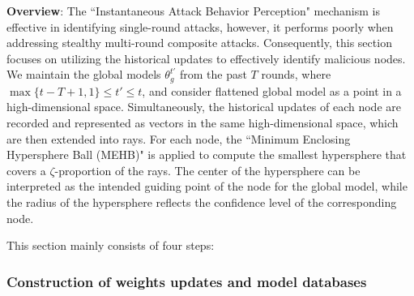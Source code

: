 \documentclass[lettersize,journal]{IEEEtran}
\begin{document}
\textbf{Overview}: The ``Instantaneous Attack Behavior Perception" mechanism is effective in identifying single-round attacks, however, it performs poorly when addressing stealthy multi-round composite attacks. Consequently, this section focuses on utilizing the historical updates to effectively identify malicious nodes. We maintain the global models $\theta_g^{t'}$ from the past $T$ rounds, where $\max\{t-T+1, 1\}\leq t'\leq t$, and consider flattened global model as a point in a high-dimensional space. 
Simultaneously, the historical updates of each node are recorded and represented as vectors in the same high-dimensional space, which are then extended into rays.
For each node, the ``Minimum Enclosing Hypersphere Ball (MEHB)" is applied to compute the smallest hypersphere that covers a 
$\zeta$-proportion of the rays. The center of the hypersphere can be interpreted as the intended guiding point of the node for the global model, while the radius of the hypersphere reflects the confidence level of the corresponding node.


This section mainly consists of four steps:

\subsubsection{Construction of weights updates and model databases}
\end{document}
